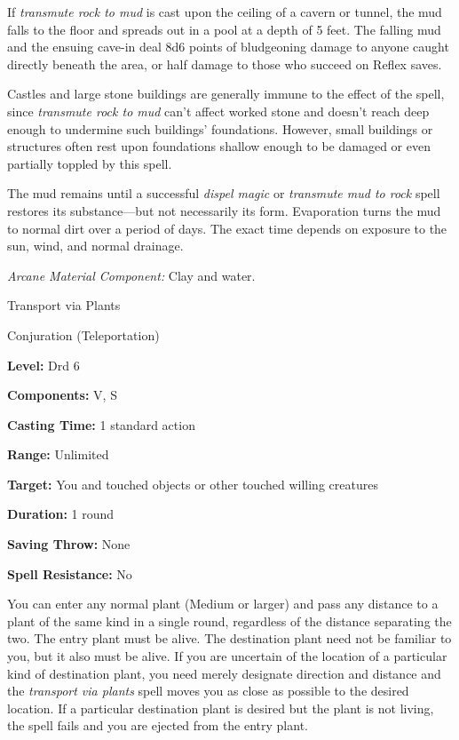 \documentclass{article}
\begin{document}
If \textit{transmute rock to mud }is cast upon the ceiling of a cavern or tunnel, 
the mud falls to the floor and spreads out in a pool at a depth of 5 feet. The 
falling mud and the ensuing cave-in deal 8d6 points of bludgeoning damage to anyone 
caught directly beneath the area, or half damage to those who succeed on Reflex 
saves.

Castles and large stone buildings are generally immune to the effect of the spell, 
since \textit{transmute rock to mud }can't affect worked stone and doesn't reach 
deep enough to undermine such buildings' foundations. However, small buildings 
or structures often rest upon foundations shallow enough to be damaged or even 
partially toppled by this spell.

The mud remains until a successful \textit{dispel magic }or \textit{transmute mud 
to rock }spell restores its substance---but not necessarily its form. Evaporation 
turns the mud to normal dirt over a period of days. The exact time depends on exposure 
to the sun, wind, and normal drainage.

\textit{Arcane Material Component: }Clay and water.

\vspace{12pt}
Transport via Plants

Conjuration (Teleportation)

\textbf{Level:} Drd 6

\textbf{Components:} V, S

\textbf{Casting Time:} 1 standard action

\textbf{Range:} Unlimited

\textbf{Target:} You and touched objects or other touched willing creatures

\textbf{Duration:} 1 round

\textbf{Saving Throw:} None

\textbf{Spell Resistance:} No

You can enter any normal plant (Medium or larger) and pass any distance to a plant 
of the same kind in a single round, regardless of the distance separating the two. 
The entry plant must be alive. The destination plant need not be familiar to you, 
but it also must be alive. If you are uncertain of the location of a particular 
kind of destination plant, you need merely designate direction and distance and 
the \textit{transport via plants }spell moves you as close as possible to the desired 
location. If a particular destination plant is desired but the plant is not living, 
the spell fails and you are ejected from the entry plant.
\end{document}
